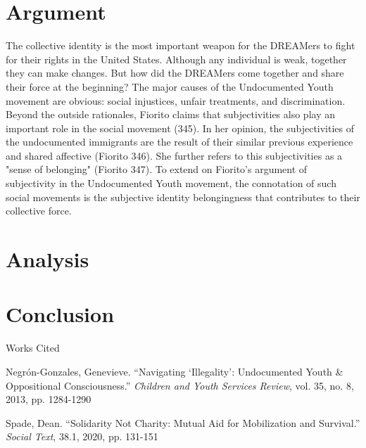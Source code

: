 \documentclass[12pt]{article}
\newcommand{\bibent}{\noindent \hangindent 40pt}
\newenvironment{workscited}{\newpage \begin{center} Works Cited \end{center}}{\newpage }
\begin{document}
\begin{flushleft}
\section{Argument}

The collective identity is the most important weapon for the DREAMers to fight for their rights in the United States. 
Although any individual is weak, together they can make changes. 
But how did the DREAMers come together and share their force at the beginning? 
The major causes of the Undocumented Youth movement are obvious: social injustices, unfair treatments, and discrimination. 
Beyond the outside rationales, Fiorito claims that subjectivities also play an important role in the social movement (345). 
In her opinion, the subjectivities of the undocumented immigrants are the result of their similar previous experience and shared affective (Fiorito 346). She further refers to this subjectivities as a "sense of belonging" (Fiorito 347). 
To extend on Fiorito's argument of subjectivity in the Undocumented Youth movement, the connotation of such social movements is the subjective identity belongingness that contributes to their collective force.


\section{Analysis}

\section{Conclusion}

\begin{workscited}

\bibent
Negr\'{o}n-Gonzales, Genevieve. ``Navigating `Illegality': Undocumented Youth \& Oppositional Consciousness.'' \textit{Children and Youth Services Review}, vol. 35, no. 8, 2013, pp. 1284-1290

\bibent
Spade, Dean. ``Solidarity Not Charity: Mutual Aid for Mobilization and Survival.'' \textit{Social Text}, 38.1, 2020, pp. 131-151


\end{workscited}

\end{flushleft}
\end{document}
